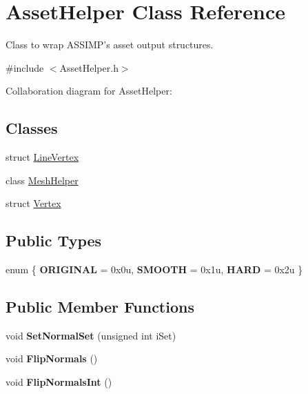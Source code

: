 \hypertarget{class_asset_helper}{\section{Asset\+Helper Class Reference}
\label{class_asset_helper}
}


Class to wrap A\+S\+S\+I\+M\+P's asset output structures.  




{\ttfamily \#include $<$Asset\+Helper.\+h$>$}



Collaboration diagram for Asset\+Helper\+:
\subsection*{Classes}
\begin{DoxyCompactItemize}
\item 
struct \hyperlink{struct_asset_helper_1_1_line_vertex}{Line\+Vertex}
\item 
class \hyperlink{class_asset_helper_1_1_mesh_helper}{Mesh\+Helper}
\item 
struct \hyperlink{struct_asset_helper_1_1_vertex}{Vertex}
\end{DoxyCompactItemize}
\subsection*{Public Types}
\begin{DoxyCompactItemize}
\item 
\hypertarget{class_asset_helper_a7b2d5633d0512736f60e20650d8dce68}{enum \{ {\bfseries O\+R\+I\+G\+I\+N\+A\+L} = 0x0u, 
{\bfseries S\+M\+O\+O\+T\+H} = 0x1u, 
{\bfseries H\+A\+R\+D} = 0x2u
 \}}\label{class_asset_helper_a7b2d5633d0512736f60e20650d8dce68}

\end{DoxyCompactItemize}
\subsection*{Public Member Functions}
\begin{DoxyCompactItemize}
\item 
\hypertarget{class_asset_helper_a1a66dca637708157473f0b1f60a14d0c}{void {\bfseries Set\+Normal\+Set} (unsigned int i\+Set)}\label{class_asset_helper_a1a66dca637708157473f0b1f60a14d0c}

\item 
\hypertarget{class_asset_helper_a8e066c6bd964ada76260671c2340c1f8}{void {\bfseries Flip\+Normals} ()}\label{class_asset_helper_a8e066c6bd964ada76260671c2340c1f8}

\item 
\hypertarget{class_asset_helper_ae36f93000eac6c8082625d128da4ccf0}{void {\bfseries Flip\+Normals\+Int} ()}\label{class_asset_helper_ae36f93000eac6c8082625d128da4ccf0}

\end{DoxyCompactItemize}
